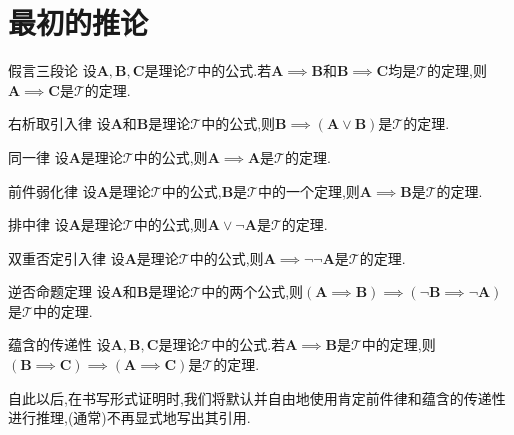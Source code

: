 \section{最初的推论}

\begin{metatheorem}{假言三段论}{}
	设$\boldsymbol{A},\boldsymbol{B},\boldsymbol{C}$是理论$\mathcal{T}$中的公式.若$\boldsymbol{A}\implies\boldsymbol{B}$和$\boldsymbol{B}\implies\boldsymbol{C}$均是$\mathcal{T}$的定理,则$\boldsymbol{A}\implies\boldsymbol{C}$是$\mathcal{T}$的定理.
\end{metatheorem}

\begin{metatheorem}{右析取引入律}{}
	设$\boldsymbol{A}$和$\boldsymbol{B}$是理论$\mathcal{T}$中的公式,则$\boldsymbol{B}\implies\left(\boldsymbol{A}\vee\boldsymbol{B}\right)$是$\mathcal{T}$的定理.
\end{metatheorem}

\begin{metatheorem}{同一律}{}
	设$\boldsymbol{A}$是理论$\mathcal{T}$中的公式,则$\boldsymbol{A}\implies\boldsymbol{A}$是$\mathcal{T}$的定理.
\end{metatheorem}

\begin{metatheorem}{前件弱化律}{}
	设$\boldsymbol{A}$是理论$\mathcal{T}$中的公式,$\boldsymbol{B}$是$\mathcal{T}$中的一个定理,则$\boldsymbol{A}\implies\boldsymbol{B}$是$\mathcal{T}$的定理.
\end{metatheorem}

\begin{metatheorem}{排中律}{}
	设$\boldsymbol{A}$是理论$\mathcal{T}$中的公式,则$\boldsymbol{A}\vee\neg\boldsymbol{A}$是$\mathcal{T}$的定理.
\end{metatheorem}

\begin{metatheorem}{双重否定引入律}{}
	设$\boldsymbol{A}$是理论$\mathcal{T}$中的公式,则$\boldsymbol{A}\implies\neg\neg\boldsymbol{A}$是$\mathcal{T}$的定理.
\end{metatheorem}

\begin{metatheorem}{逆否命题定理}{}
	设$\boldsymbol{A}$和$\boldsymbol{B}$是理论$\mathcal{T}$中的两个公式,则$\left(\boldsymbol{A}\implies\boldsymbol{B}\right)\implies\left(\neg\boldsymbol{B}\implies\neg\boldsymbol{A}\right)$是$\mathcal{T}$中的定理.
\end{metatheorem}

\begin{metatheorem}{蕴含的传递性}{}
	设$\boldsymbol{A},\boldsymbol{B},\boldsymbol{C}$是理论$\mathcal{T}$中的公式.若$\boldsymbol{A}\implies\boldsymbol{B}$是$\mathcal{T}$中的定理,则$\left(\boldsymbol{B}\implies\boldsymbol{C}\right)\implies\left(\boldsymbol{A}\implies\boldsymbol{C}\right)$是$\mathcal{T}$的定理.
\end{metatheorem}

自此以后,在书写形式证明时,我们将默认并自由地使用肯定前件律和蕴含的传递性进行推理,(通常)不再显式地写出其引用.